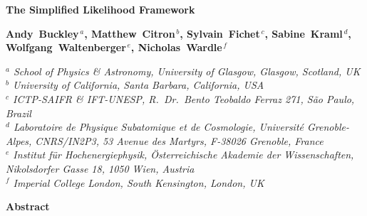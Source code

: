 \documentclass[11pt]{article}
\begin{document}
\vspace*{30mm}

\begin{center}
{\LARGE \bf The Simplified Likelihood Framework
}
\par\vspace*{20mm}\par

{\large \bf Andy~Buckley$^{\,a}$, Matthew~Citron$^{\,b}$,  Sylvain~Fichet$^{\,c}$, Sabine~Kraml$^{\,d}$, Wolfgang~Waltenberger$^{\,e}$, Nicholas~Wardle$^{\,f}$}

\bigskip

{\em $^a$ School of Physics \& Astronomy, University of Glasgow, Glasgow, Scotland, UK}
\\
{\em $^b$ University of California, Santa Barbara, California, USA}
\\
{\em $^c$ ICTP-SAIFR \& IFT-UNESP, R.\ Dr.\ Bento Teobaldo Ferraz 271, S\~ao Paulo, Brazil}
\\
{\em $^d$ Laboratoire de Physique Subatomique et de Cosmologie, Universit\'e Grenoble-Alpes, CNRS/IN2P3, 53 Avenue des Martyrs, F-38026 Grenoble, France}
\\
{\em $^e$ Institut f\"ur Hochenergiephysik,  \"Osterreichische Akademie der Wissenschaften, Nikolsdorfer Gasse 18, 1050 Wien, Austria}
\\
{\em $^f$ Imperial College London, South Kensington, London, UK}
\vspace*{5mm}



\vspace*{15mm}

{  \bf  Abstract }

\end{center}
\vspace*{1mm}



\noindent
\begin{abstract}

We %
discuss the simplified likelihood framework %
as a systematic approximation scheme  for experimental likelihoods such as those originating from LHC experiments.
We develop the simplified likelihood from the Central Limit Theorem keeping the next-to-leading term in the large $N$ expansion to correctly account for asymmetries. Moreover, we present an efficient method to compute the parameters of the simplified likelihood  from Monte Carlo simulations. The approach is validated using a realistic LHC-like analysis, and the limits of the approximation are explored. 
Finally we discuss how the simplified likelihood data can be conveniently released in the  HepData error source format and automatically 
built from it, making this framework a convenient tool to transmit realistic experimental likelihoods to the community.


\end{abstract}
\end{document}
